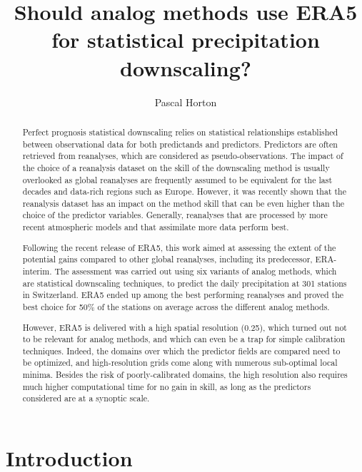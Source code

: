 \documentclass[alpha-refs]{wiley-article}
\title{Should analog methods use ERA5 for statistical precipitation downscaling? }
\author[1]{Pascal Horton}
\affil[1]{Oeschger Centre for Climate Change Research and Institute of Geography, University of Bern, Bern, Switzerland}
\begin{document}
\maketitle

\begin{abstract}
Perfect prognosis statistical downscaling relies on statistical relationships established between observational data for both predictands and predictors. Predictors are often retrieved from reanalyses, which are considered as pseudo-observations. The impact of the choice of a reanalysis dataset on the skill of the downscaling method is usually overlooked as global reanalyses are frequently assumed to be equivalent for the last decades and data-rich regions such as Europe. However, it was recently shown that the reanalysis dataset has an impact on the method skill that can be even higher than the choice of the predictor variables. Generally, reanalyses that are processed by more recent atmospheric models and that assimilate more data perform best.

Following the recent release of ERA5, this work aimed at assessing the extent of the potential gains compared to other global reanalyses, including its predecessor, ERA-interim. The assessment was carried out using six variants of analog methods, which are statistical downscaling techniques, to predict the daily precipitation at 301 stations in Switzerland. ERA5 ended up among the best performing reanalyses and proved the best choice for 50\% of the stations on average across the different analog methods.

However, ERA5 is delivered with a high spatial resolution (0.25\degree), which turned out not to be relevant for analog methods, and which can even be a trap for simple calibration techniques. Indeed, the domains over which the predictor fields are compared need to be optimized, and high-resolution grids come along with numerous sub-optimal local minima. Besides the risk of poorly-calibrated domains, the high resolution also requires much higher computational time for no gain in skill, as long as the predictors considered are at a synoptic scale.


\end{abstract}

\linenumbers

\section{Introduction}
\end{document}
